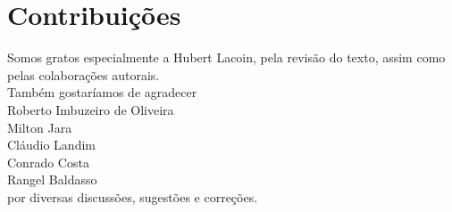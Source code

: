 \chapter*{Contribuições}

Somos gratos especialmente a Hubert Lacoin, pela revisão do texto, assim como pelas colaborações autorais.\\

\noindent
Também gostaríamos de agradecer\\

\noindent
Roberto Imbuzeiro de Oliveira\\
Milton Jara\\
Cláudio Landim\\
Conrado Costa\\
Rangel Baldasso\\

\noindent
por diversas discussões, sugestões e correções.

